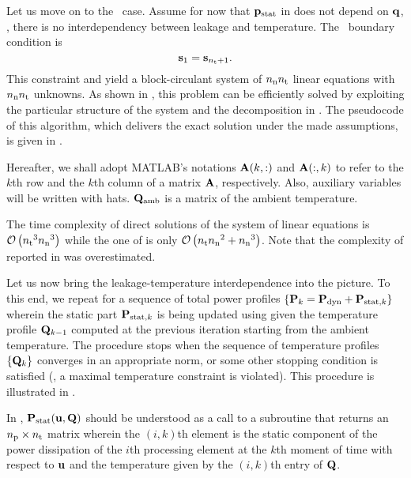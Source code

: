 Let us move on to the \dss\ case.
Assume for now that $\mathbf{p}_{\text{stat}}$ in  does not depend on $\mathbf{q}$, \ie, there is no interdependency between leakage and temperature.
The \dss\ boundary condition is
\[
  \mathbf{s}_1 = \mathbf{s}_{{n_\text{t}} + 1}.
\]
This constraint and  yield a block-circulant system of ${n_\text{n}} {n_\text{t}}$ linear equations with ${n_\text{n}} {n_\text{t}}$ unknowns.
As shown in \cite{ukhov2012}, this problem can be efficiently solved by exploiting the particular structure of the system and the decomposition in .
The pseudocode of this algorithm, which delivers the exact solution under the made assumptions, is given in .


Hereafter, we shall adopt MATLAB's \cite{matlab} notations $\mathbf{A}(k, :)$ and $\mathbf{A}(:, k)$ to refer to the $k$th row and the $k$th column of a matrix $\mathbf{A}$, respectively.
Also, auxiliary variables will be written with hats.
$\mathbf{Q}_{\text{amb}}$ is a matrix of the ambient temperature.
\begin{remark}
The time complexity of direct solutions of the system of linear equations is $\mathcal{O}\left( {n_\text{t}}^3 {n_\text{n}}^3 \right)$ while the one of  is only $\mathcal{O}\left( {n_\text{t}} {n_\text{n}}^2 + {n_\text{n}}^3 \right)$.
Note that the complexity of  reported in \cite{ukhov2012} was overestimated.
\end{remark}

Let us now bring the leakage-temperature interdependence into the picture.
To this end, we repeat  for a sequence of total power profiles $\{ \mathbf{P}_k = \mathbf{P}_{\text{dyn}} + \mathbf{P}_{\text{stat}, k} \}$ wherein the static part $\mathbf{P}_{\text{stat}, k}$ is being updated using  given the temperature profile $\mathbf{Q}_{k - 1}$ computed at the previous iteration starting from the ambient temperature.
The procedure stops when the sequence of temperature profiles $\{ \mathbf{Q}_k \}$ converges in an appropriate norm, or some other stopping condition is satisfied (\eg, a maximal temperature constraint is violated).
This procedure is illustrated in .


In , $\mathbf{P}_{\text{stat}}(\mathbf{u}, \mathbf{Q})$ should be understood as a call to a subroutine that returns an ${n_\text{p}} \times {n_\text{t}}$ matrix wherein the $(i, k)$th element is the static component of the power dissipation of the $i$th processing element at the $k$th moment of time with respect to $\mathbf{u}$ and the temperature given by the $(i, k)$th entry of $\mathbf{Q}$.

